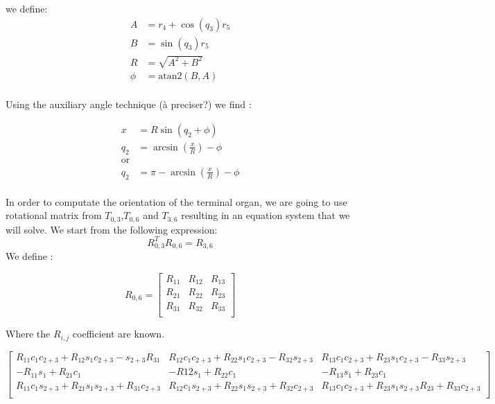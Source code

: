 \documentclass{article}
\begin{document}
we define:
\begin{align*}
  A&= r_4+\cos(q_3)r_5\\
  B&= \sin(q_3)r_5 \\
  R&=\sqrt{A^2+B^2}\\
  \phi&=\text{atan2}(B,A)\\
\end{align*}

Using the auxiliary angle technique (à preciser?) we find :

\begin{align*}
  x&=R\sin(q_2+\phi)\\
  q_2&=\arcsin(\frac{x}{R})-\phi\\
  \text{or}\\
  q_2&=\pi-\arcsin(\frac{x}{R})-\phi\\
\end{align*}

In order to computate the orientation of the terminal organ, we are going to use rotational matrix from $T_{0,3}$,$T_{0,6}$ and $T_{3,6}$  resulting in an equation system that we will solve.
We start from the following expression:
\begin{equation}
  R_{0,3}^TR_{0,6}=R_{3,6}
\end{equation}
We define :

\begin{equation}
  R_{0,6}=
  \begin{bmatrix}
    R_{11} & R_{12} & R_{13}\\
    R_{21} & R_{22} & R_{23}\\
    R_{31} & R_{32} & R_{33}\\
  \end{bmatrix}
\end{equation}

Where the $R_{i,j}$ coefficient are known.

\begin{equation}
  \begin{bmatrix}
    R_{11}c_1c_{2+3}+R_{12}s_1c_{2+3}-s_{2+3}R_{31} & R_{12}c_1c_{2+3}+R_{22}s_1c_{2+3}-R_{32}s_{2+3} & R_{13}c_1c_{2+3}+R_{23}s_1c_{2+3}-R_{33}s_{2+3}\\
    -R_{11}s_1+R_{21}c_1 & -R{12}s_1+R_{22}c_1 & -R_{13}s_1+R_{23}c_1\\
    R_{11}c_1s_{2+3}+R_{21}s_1s_{2+3}+R_{31}c_{2+3} & R_{12}c_1s_{2+3}+R_{22}s_1s_{2+3}+R_{32}c_{2+3} & R_{13}c_1c_{2+3}+R_{23}s_1s_{2+3}R_{23}+R_{33}c_{2+3}\\
  \end{bmatrix}
\end{equation}
\end{document}
